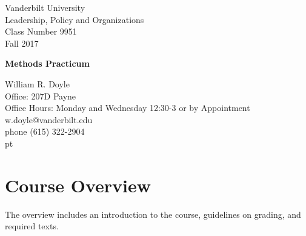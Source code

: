 \documentclass[12pt]{article}
\begin{document}


\thispagestyle{empty}%


\setlength{\parskip}{1ex plus 0.5ex minus 0.2ex}

\setcounter{secnumdepth}{-2}



\begin{flushleft}
Vanderbilt University\\
Leadership, Policy and Organizations\\
Class Number 9951\\ 
Fall 2017\\
\end{flushleft}

\begin{center}
\Large{\textbf{Methods Practicum}}\\
\end{center}

\begin{flushleft}
William R. Doyle\\
Office: 207D Payne\\
Office Hours: Monday and Wednesday 12:30-3 or by Appointment \\
w.doyle@vanderbilt.edu\\
phone (615) 322-2904\\

 pt

\end{flushleft}

\section{Course Overview}%

The overview includes an introduction to the course, guidelines on grading, and required texts.
\end{document}
